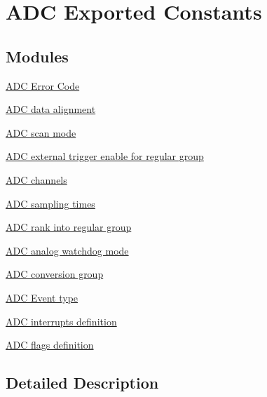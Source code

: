 \hypertarget{group___a_d_c___exported___constants}{}\section{A\+DC Exported Constants}
\label{group___a_d_c___exported___constants}
\subsection*{Modules}
\begin{DoxyCompactItemize}
\item 
\hyperlink{group___a_d_c___error___code}{A\+D\+C Error Code}
\item 
\hyperlink{group___a_d_c___data__align}{A\+D\+C data alignment}
\item 
\hyperlink{group___a_d_c___scan__mode}{A\+D\+C scan mode}
\item 
\hyperlink{group___a_d_c___external__trigger__edge___regular}{A\+D\+C external trigger enable for regular group}
\item 
\hyperlink{group___a_d_c__channels}{A\+D\+C channels}
\item 
\hyperlink{group___a_d_c__sampling__times}{A\+D\+C sampling times}
\item 
\hyperlink{group___a_d_c__regular__rank}{A\+D\+C rank into regular group}
\item 
\hyperlink{group___a_d_c__analog__watchdog__mode}{A\+D\+C analog watchdog mode}
\item 
\hyperlink{group___a_d_c__conversion__group}{A\+D\+C conversion group}
\item 
\hyperlink{group___a_d_c___event__type}{A\+D\+C Event type}
\item 
\hyperlink{group___a_d_c__interrupts__definition}{A\+D\+C interrupts definition}
\item 
\hyperlink{group___a_d_c__flags__definition}{A\+D\+C flags definition}
\end{DoxyCompactItemize}


\subsection{Detailed Description}
